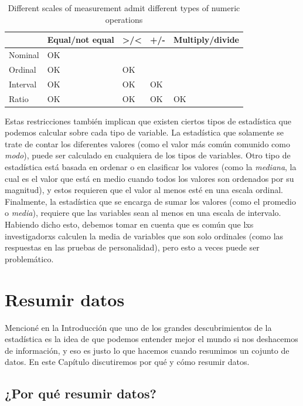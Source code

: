 \documentclass[
  12pt,
]{book}
\theoremstyle{definition}
\theoremstyle{definition}
\theoremstyle{definition}
\theoremstyle{remark}
\begin{document}
\begin{table}

\caption{\label{tab:MeasurementTypes}Different scales of measurement admit different types of numeric operations}
\centering
\begin{tabular}[t]{lllll}
\toprule
  & Equal/not equal & >/< & +/- & Multiply/divide\\
\midrule
Nominal & OK &  &  & \\
Ordinal & OK & OK &  & \\
Interval & OK & OK & OK & \\
Ratio & OK & OK & OK & OK\\
\bottomrule
\end{tabular}
\end{table}

Estas restricciones también implican que existen ciertos tipos de estadística que podemos calcular sobre cada tipo de variable. La estadística que solamente se trate de contar los diferentes valores (como el valor más común comunido como \emph{modo}), puede ser calculado en cualquiera de los tipos de variables. Otro tipo de estadística está basada en ordenar o en clasificar los valores (como la \emph{mediana}, la cual es el valor que está en medio cuando todos los valores son ordenados por su magnitud), y estos requieren que el valor al menos esté en una escala ordinal. Finalmente, la estadística que se encarga de sumar los valores (como el promedio o \emph{media}), requiere que las variables sean al menos en una escala de intervalo. Habiendo dicho esto, debemos tomar en cuenta que es común que lxs investigadorxs calculen la media de variables que son solo ordinales (como las respuestas en las pruebas de personalidad), pero esto a veces puede ser problemático.

\hypertarget{resumir-datos}{%
\chapter{Resumir datos}\label{resumir-datos}}

Mencioné en la Introducción que uno de los grandes descubrimientos de la estadística es la idea de que podemos entender mejor el mundo si nos deshacemos de información, y eso es justo lo que hacemos cuando resumimos un cojunto de datos.
En este Capítulo discutiremos por qué y cómo resumir datos.

\hypertarget{por-quuxe9-resumir-datos}{%
\section{¿Por qué resumir datos?}\label{por-quuxe9-resumir-datos}}
\end{document}
